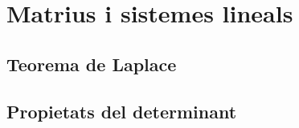 \documentclass[12pt]{book}
\begin{document}

\chapter{Matrius i sistemes lineals}
	\section{Teorema de Laplace}
	
	\newpage
	\section{Propietats del determinant}
	



\end{document}
